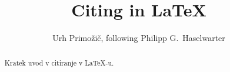 \documentclass[a4paper]{article}
\begin{document}
\author{Urh Primožič, following Philipp G.~Haselwarter}
\title{Citing in \LaTeX{}}
\maketitle
\begin{abstract}
    Kratek uvod v citiranje v \LaTeX -u.    
\end{abstract}
\end{document}
